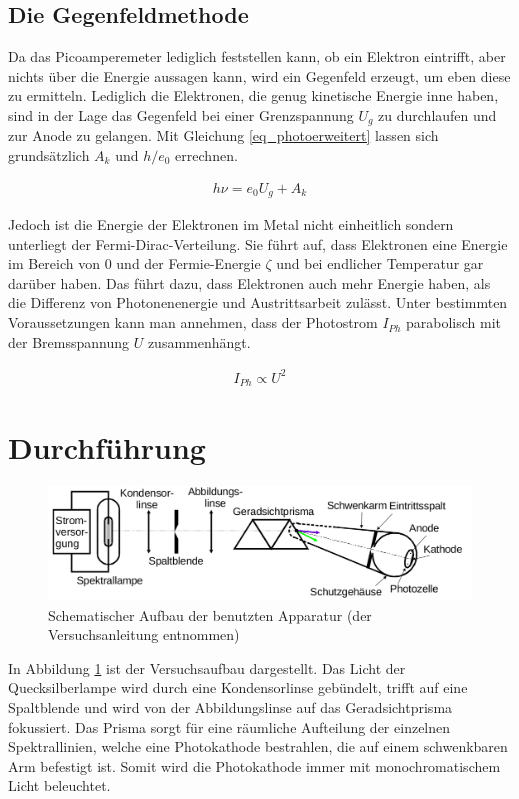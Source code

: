 \subsection{Die Gegenfeldmethode}
Da das Picoamperemeter lediglich feststellen kann, ob ein Elektron eintrifft, aber nichts über die Energie aussagen kann, wird ein
Gegenfeld erzeugt, um eben diese zu ermitteln. Lediglich die Elektronen, die genug kinetische Energie inne haben, sind in der Lage
das Gegenfeld bei einer Grenzspannung $U_g$ zu durchlaufen und zur Anode zu gelangen. Mit Gleichung \eqref{eq_photoerweitert} lassen sich grundsätzlich $A_k$ und 
$h/e_0$ errechnen.

\begin{align}
 h\nu = e_0 U_g + A_k
 \label{eq_photoerweitert}
\end{align}

Jedoch ist die Energie der Elektronen im Metal nicht einheitlich sondern unterliegt der Fermi-Dirac-Verteilung. Sie führt auf, dass
Elektronen eine Energie im Bereich von 0 und der Fermie-Energie $\zeta$ und bei endlicher Temperatur gar darüber haben. Das führt dazu,
dass Elektronen auch mehr Energie haben, als die Differenz von Photonenenergie und Austrittsarbeit zulässt. Unter bestimmten 
Voraussetzungen kann man annehmen, dass der Photostrom $I_{Ph}$ parabolisch mit der Bremsspannung $U$ zusammenhängt. 

\begin{align}
 I_{Ph} \propto U^2
 \label{eq_stromspannung}
\end{align}

\section{Durchführung}
\begin{figure}[H]
 \includegraphics[width=\textwidth]{pics/Aufbau.png}
 \caption{Schematischer Aufbau der benutzten Apparatur (der Versuchsanleitung entnommen)}
 \label{pic_aufbau}
\end{figure}

In Abbildung \ref{pic_aufbau} ist der Versuchsaufbau dargestellt. Das Licht der Quecksilberlampe wird durch eine Kondensorlinse gebündelt,
trifft auf eine Spaltblende und wird von der Abbildungslinse auf das Geradsichtprisma fokussiert. Das Prisma sorgt für eine räumliche
Aufteilung der einzelnen Spektrallinien, welche eine Photokathode bestrahlen, die auf einem schwenkbaren Arm befestigt ist. Somit wird
die Photokathode immer mit monochromatischem Licht beleuchtet. 

